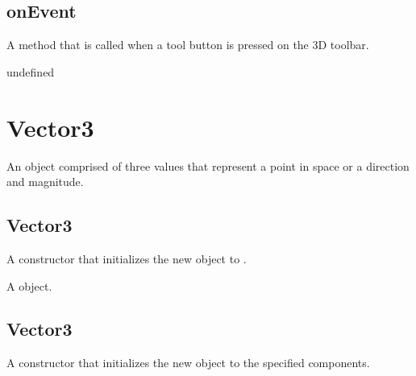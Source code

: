 \documentclass[letterpaper,12pt,english,openany,oneside]{sphinxmanual}
\begin{document}
\subsection{onEvent}
\label{\detokenize{JS_3D_API:onevent-10}}\label{\detokenize{JS_3D_API:id43}}
A method that is called when a tool button is pressed on the 3D toolbar.

\label{\detokenize{JS_3D_API:syntax-126}}

\begin{sphinxVerbatim}[commandchars=\\\{\}]
\end{sphinxVerbatim}
\label{\detokenize{JS_3D_API:parameters-89}}

\label{\detokenize{JS_3D_API:section-126}}\label{\detokenize{JS_3D_API:returns-127}}

undefined


\section{Vector3}
\label{\detokenize{JS_3D_API:vector3}}
An object comprised of three values that represent a point in space or a direction and magnitude.

\label{\detokenize{JS_3D_API:properties-34}}


\subsection{Vector3}
\label{\detokenize{JS_3D_API:vector3-1}}\label{\detokenize{JS_3D_API:id44}}
A constructor that initializes the new object to .

\label{\detokenize{JS_3D_API:syntax-127}}

\begin{sphinxVerbatim}[commandchars=\\\{\}]
 
\end{sphinxVerbatim}
\label{\detokenize{JS_3D_API:returns-128}}

A  object.


\subsection{Vector3}
\label{\detokenize{JS_3D_API:vector3-2}}\label{\detokenize{JS_3D_API:id45}}
A constructor that initializes the new object to the specified components.
\end{document}
